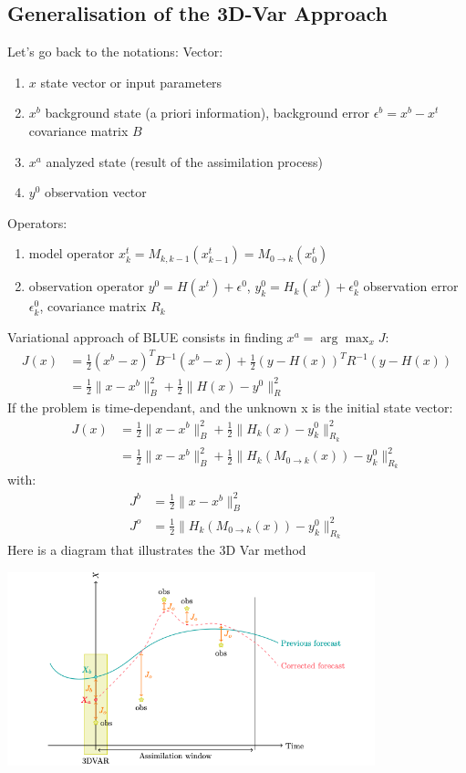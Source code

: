 \documentclass{article}
\begin{document}
\subsection{Generalisation of the 3D-Var Approach}
\noindent Let's go back to the notations:
\noindent Vector:
 \begin{enumerate}[label=\textbullet]
		\item $x$ state vector or input parameters
		\item $x^{b}$ background state (a priori information), background  error $\epsilon^b=x^b-x^t$ covariance matrix $B$
		\item $x^{a}$ analyzed state (result of the assimilation process)
		\item $y^0$ observation vector
	\end{enumerate}
\noindent Operators:
    \begin{enumerate}[label=\textbullet]
		\item model operator $x_{k}^{t} = M_{k,k-1}(x_{k-1}^{t})=M_{0 \rightarrow k}(x_0^t)$
		\item observation operator $y^0 = H (x^t) + \epsilon^0$, $y_k^0 = H_k(x^t) + \epsilon_k^0$ observation error $\epsilon_k^0$, covariance matrix $R_k$
	\end{enumerate}
\noindent Variational approach of BLUE consists in finding $x^a=\arg\max_{x}J$:
$$\begin{aligned}
J(x)&=\frac{1}{2}(x^b-x)^TB^{-1}(x^b-x)+\frac{1}{2}(y-H(x))^TR^{-1}(y-H(x)) \\
&=\frac{1}{2}\|x-x^b\|_B^2+\frac{1}{2}\|H(x)-y^0\|_R^2
\end{aligned}$$
If the problem is time-dependant, and the unknown x is the initial state vector:
$$\begin{aligned}
J(x)&=\frac{1}{2}\|x-x^b\|_B^2+\frac{1}{2}\|H_k(x)-y_k^0\|_{R_{k}}^2 \\
&=\frac{1}{2}\|x-x^b\|_B^2+\frac{1}{2}\|H_k(M_{0 \rightarrow k}(x))-y_k^0\|_{R_{k}}^2
\end{aligned}$$
with:
$$\begin{aligned}
J^b&=\frac{1}{2}\|x-x^b\|_B^2\\
J^o&=\frac{1}{2}\|H_k(M_{0 \rightarrow k}(x))-y_k^0\|_{R_{k}}^2
\end{aligned}$$
\vspace*{5mm}
Here is a diagram that illustrates the 3D Var method 
\begin{center}
		\includegraphics[width=0.8\textwidth]{"images/schema_3D_Var.png"}
	\end{center}
\end{document}
